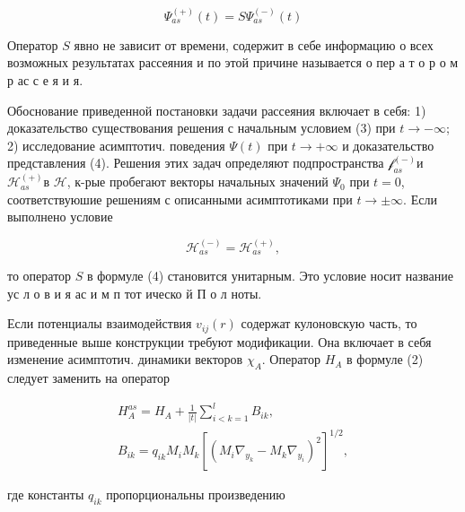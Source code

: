 \documentclass[10pt]{article}
\begin{document}
\[

\Psi_{a s}^{(+)}(t)=S \Psi_{a s}^{(-)}(t)

\]



Оператор $S$ явно не зависит от времени, содержит в себе информацию о всех возможных результатах рассеяния и по этой причине называется о пер а т о р о м р ас с е я и я.



Обоснование приведенной постановки задачи рассеяния включает в себя: 1) доказательство существования решения с начальным условием (3) при $t \rightarrow-\infty$; 2) исследование асимптотич. поведения $\Psi(t)$ при $t \rightarrow+\infty$ и доказательство представления (4). Решения этих задач определяют подпространства $\mathscr{f}_{a s}^{(-)}$и $\mathscr{H}_{a s}^{(+)}$в $\mathscr{H}$, к-рые пробегают векторы начальных значений $\Psi_{0}$ при $t=0$, соответствуюшие решениям с описанными асимптотиками при $t \rightarrow \pm \infty$. Если выполнено условие



\[

\mathscr{H}_{a s}^{(-)}=\mathscr{H}_{a s}^{(+)},

\]



то оператор $S$ в формуле (4) становится унитарным. Это условие носит название ус л о в и я ас и м п тот ическо й П о л ноты.



Если потенциалы взаимодействия $v_{i j}(r)$ содержат кулоновскую часть, то приведенные выше конструкции требуют модификации. Она включает в себя изменение асимптотич. динамики векторов $\chi_{A}$. Оператор $H_{A}$ в формуле (2) следует заменить на оператор



\[

\begin{gathered}

H_{A}^{a s}=H_{A}+\frac{1}{|t|} \sum_{i<k=1}^{l} B_{i k}, \\

B_{i k}=q_{i k} M_{i} M_{k}\left[\left(M_{i} \nabla_{y_{k}}-M_{k} \nabla_{y_{i}}\right)^{2}\right]^{1 / 2},

\end{gathered}

\]



где константы $q_{i k}$ пропорциональны произведению
\end{document}
